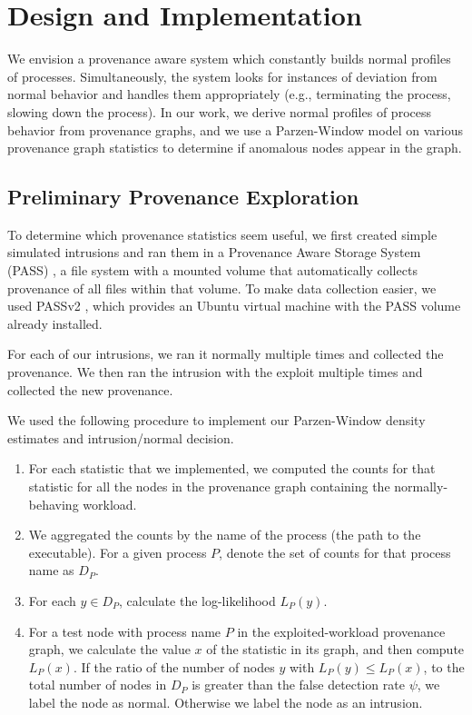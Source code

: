 \documentclass[10pt,twocolumn]{article}
\begin{document}
%

\section{Design and Implementation}

We envision a provenance aware system which constantly builds normal profiles of processes. Simultaneously,
the system looks for instances of deviation from normal behavior and handles them appropriately
(e.g., terminating the process, slowing down the process). In our work, we derive normal profiles of process behavior
from provenance graphs, and we use a Parzen-Window model on various provenance graph statistics
to determine if anomalous nodes appear in the graph.

\subsection{Preliminary Provenance Exploration}

To determine which provenance statistics seem useful, we first created simple simulated intrusions
and ran them in a Provenance Aware Storage System (PASS) \cite{pass}, a file system with
a mounted volume that automatically collects provenance of all files within that volume.
To make data collection easier, we used PASSv2 \cite{passv2}, which provides an Ubuntu virtual machine with
the PASS volume already installed.

For each of our intrusions, we ran it normally multiple times and collected the provenance. We then ran the
intrusion with the exploit multiple times and collected the new provenance.

We used the following procedure to implement our Parzen-Window density estimates and
intrusion/normal decision.
\begin{enumerate}
\item For each statistic that we implemented, we computed the counts for that statistic for all the
nodes in the provenance graph containing the normally-behaving workload.
\item We aggregated the counts by the name of the process (the path to the executable). For a given process $P$, denote the
set of counts for that process name as $D_P$.
\item For each $y \in D_P$, calculate the log-likelihood $L_P(y)$.
\item For a test node with process name $P$ in the exploited-workload provenance graph, we calculate the value $x$ of the statistic in its graph, and then compute $L_P(x)$. 
If the ratio of the number of nodes $y$ with $L_P(y) \leq L_P(x)$,
to the total number of nodes in $D_P$ is greater than the false detection rate $\psi$, we label the node as normal. Otherwise we label the node as
an intrusion.
\end{enumerate}
\end{document}
